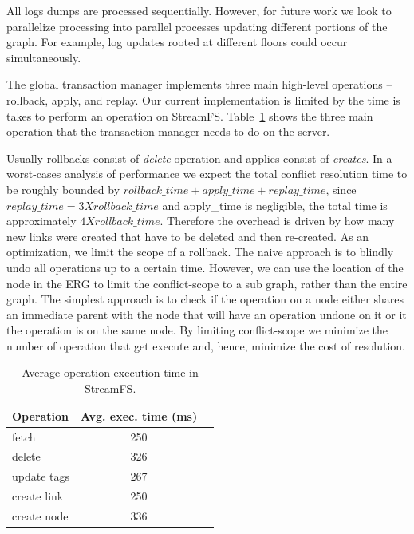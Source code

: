 All logs dumps are processed sequentially.  However, for future work we look to parallelize processing into
parallel processes updating different portions of the graph.  For example, log updates rooted at different floors
could occur simultaneously.

The global transaction manager implements three main high-level operations -- rollback, apply, and replay.  Our current implementation
is limited by the time is takes to perform an operation on StreamFS.  Table~\ref{tab:optimes} shows the three 
main operation that the transaction manager needs to do on the server.

Usually rollbacks consist of \emph{delete} operation and applies consist of \emph{creates}.  In a worst-cases analysis
of performance we expect the total conflict resolution time to be roughly bounded by
$rollback\_time + apply\_time + replay\_time$, since $replay\_time=3 X rollback\_time$ and apply\_time is negligible, 
the total time is approximately $4 X rollback\_time$.  Therefore the overhead is driven by how many new links were created
that have to be deleted and then re-created.  As an optimization, we limit the scope of a rollback.  The naive
approach is to blindly undo all operations up to a certain time.  However, we can use the location of the node
in the ERG to limit the conflict-scope to a sub graph, rather than the entire graph.  The simplest approach is to check if the operation
on a node either shares an immediate parent with the node that will have an operation undone on it or it the operation
is on the same node.  By limiting conflict-scope we minimize the number of operation that get execute and, hence, minimize the 
cost of resolution.


\begin{table}
\begin{center}
  \begin{tabular}{| l | c  c | }
    \hline
    {\textbf Operation } & {\textbf Avg. exec. time (ms) } &\\ \hline
    fetch & 250 &\\ \hline
    delete & 326  &\\ \hline
    update tags & 267  &\\ \hline
    create link & 250  &\\ \hline
    create node & 336  &\\ 
    \hline
  \end{tabular}
\caption{Average operation execution time in StreamFS.}
\label{tab:optimes}
\end{center}
\end{table}

